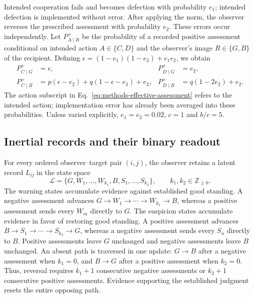 \documentclass[fleqn,10pt]{article}
\begin{document}
Intended cooperation fails and becomes defection with probability $e_1$; intended defection is implemented without error. After applying the norm, the observer reverses the prescribed assessment with probability $e_2$. These errors occur independently. Let $P^+_{A\mid R}$ be the probability of a recorded positive assessment conditional on intended action $A\in\{C,D\}$ and the observer's image $R\in\{G,B\}$ of the recipient. Defining $\epsilon=(1-e_1)(1-e_2)+e_1e_2$, we obtain
\begin{equation}
\begin{aligned}
P^+_{C\mid G}&=\epsilon,
& P^+_{D\mid G}&=e_2,\\
P^+_{C\mid B}&=p(\epsilon-e_2)+q(1-\epsilon-e_2)+e_2,
& P^+_{D\mid B}&=q(1-2e_2)+e_2.
\end{aligned}
\label{eq:methods-effective-assessment}
\end{equation}
The action subscript in Eq.~\eqref{eq:methods-effective-assessment} refers to the intended action; implementation error has already been averaged into these probabilities. Unless varied explicitly, $e_1=e_2=0.02$, $c=1$ and $b/c=5$.

\subsection*{Inertial records and their binary readout}

For every ordered observer--target pair $(i,j)$, the observer retains a latent record $L_{ij}$ in the state space
\begin{equation}
\mathcal L=\{G,W_1,\ldots,W_{k_1},B,S_1,\ldots,S_{k_2}\},
\qquad k_1,k_2\in\mathbb Z_{\geq0}.
\label{eq:methods-latent-states}
\end{equation}
The warning states accumulate evidence against established good standing. A negative assessment advances $G\to W_1\to\cdots\to W_{k_1}\to B$, whereas a positive assessment sends every $W_m$ directly to $G$. The suspicion states accumulate evidence in favor of restoring good standing. A positive assessment advances $B\to S_1\to\cdots\to S_{k_2}\to G$, whereas a negative assessment sends every $S_n$ directly to $B$. Positive assessments leave $G$ unchanged and negative assessments leave $B$ unchanged. An absent path is traversed in one update: $G\to B$ after a negative assessment when $k_1=0$, and $B\to G$ after a positive assessment when $k_2=0$. Thus, reversal requires $k_1+1$ consecutive negative assessments or $k_2+1$ consecutive positive assessments. Evidence supporting the established judgment resets the entire opposing path.
\end{document}

